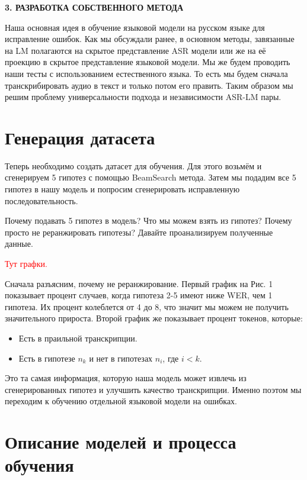 \newpage
\begin{center}
  \textbf{\large 3. РАЗРАБОТКА СОБСТВЕННОГО МЕТОДА}
\end{center}

Наша основная идея в обучение языковой модели на русском языке для исправление ошибок.
Как мы обсуждали ранее, в основном методы, завязанные на LM полагаются на скрытое представление ASR модели или же на её проекцию в скрытое представление языковой модели.
Мы же будем проводить наши тесты с использованием естественного языка.
То есть мы будем сначала транскрибировать аудио в текст и только потом его править.
Таким образом мы решим проблему универсальности подхода и независимости ASR-LM пары.

\section{Генерация датасета}
Теперь необходимо создать датасет для обучения.
Для этого возьмём и сгенерируем 5 гипотез с помощью BeamSearch метода.
Затем мы подадим все 5 гипотез в нашу модель и попросим сгенерировать исправленную последовательность.

Почему подавать 5 гипотез в модель? Что мы можем взять из гипотез?
Почему просто не реранжировать гипотезы?
Давайте проанализируем полученные данные.

\textcolor{red}{Тут графки.}

Сначала разъясним, почему не реранжирование.
Первый график на Рис. 1 показывает процент случаев, когда гипотеза 2-5 имеют ниже WER, чем 1 гипотеза.
Их процент колеблется от 4 до 8, что значит мы можем не получить значительного прироста.
Второй график же показывает процент токенов, которые:
\begin{itemize}
  \item Есть в праильной транскрипции.
  \item Есть в гипотезе $n_k$ и нет в гипотезах $n_i$, где $i < k$.
\end{itemize}

Это та самая информация, которую наша модель может извлечь из сгенерированных гипотез и улучшить качество транскрипции.
Именно поэтом мы переходим к обучению отдельной языковой модели на ошибках.

\section{Описание моделей и процесса обучения}

